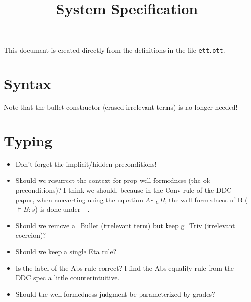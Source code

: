 \documentclass{article}
\title{System Specification}
\begin{document}
\maketitle

This document is created directly from the definitions in the file
{\texttt{ett.ott}}.

\section{Syntax}
\ottgrammartabular{
\otttm\ottinterrule
\ottcontext\ottafterlastrule
}
Note that the bullet constructor (erased irrelevant terms) is no longer needed!

\section{Typing}
\begin{itemize}
\item Don't forget the implicit/hidden preconditions!
\end{itemize}
\begin{itemize}
\item Should we resurrect the context for prop well-formedness (the ok
  preconditions)? I think we should, because in the Conv rule of the
  DDC paper, when converting using the equation $A \sim_C B$, the
  well-formedness of B ($\vDash B : s$) is done under $\top$.
\end{itemize}
\begin{itemize}
\item Should we remove a\_Bullet (irrelevant term) but keep g\_Triv (irrelevant coercion)?
\item Should we keep a single Eta rule?
\item Is the label of the Abs rule correct? I find the Abs equality rule from the DDC spec a little counterintuitive.
\end{itemize}
\begin{itemize}
\item Should the well-formedness judgment be parameterized by grades?
\end{itemize}
\end{document}

